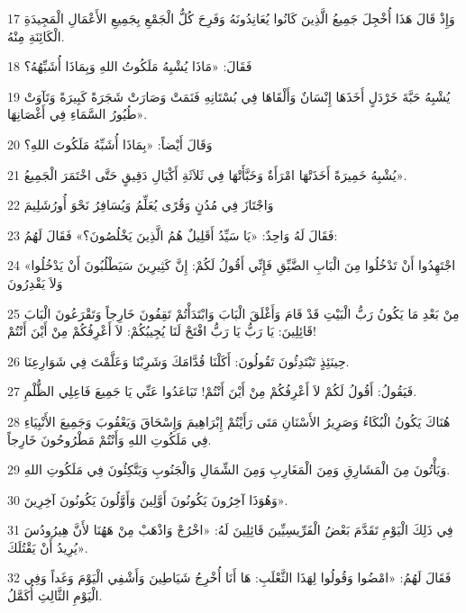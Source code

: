 \par 17 وَإِذْ قَالَ هَذَا أُخْجِلَ جَمِيعُ الَّذِينَ كَانُوا يُعَانِدُونَهُ وَفَرِحَ كُلُّ الْجَمْعِ بِجَمِيعِ الأَعْمَالِ الْمَجِيدَةِ الْكَائِنَةِ مِنْهُ.
\par 18 فَقَالَ: «مَاذَا يُشْبِهُ مَلَكُوتُ اللهِ وَبِمَاذَا أُشَبِّهُهُ؟
\par 19 يُشْبِهُ حَبَّةَ خَرْدَلٍ أَخَذَهَا إِنْسَانٌ وَأَلْقَاهَا فِي بُسْتَانِهِ فَنَمَتْ وَصَارَتْ شَجَرَةً كَبِيرَةً وَتَآوَتْ طُيُورُ السَّمَاءِ فِي أَغْصَانِهَا».
\par 20 وَقَالَ أَيْضاً: «بِمَاذَا أُشَبِّهُ مَلَكُوتَ اللهِ؟
\par 21 يُشْبِهُ خَمِيرَةً أَخَذَتْهَا امْرَأَةٌ وَخَبَّأَتْهَا فِي ثَلاَثَةِ أَكْيَالِ دَقِيقٍ حَتَّى اخْتَمَرَ الْجَمِيعُ».
\par 22 وَاجْتَازَ فِي مُدُنٍ وَقُرًى يُعَلِّمُ وَيُسَافِرُ نَحْوَ أُورُشَلِيمَ
\par 23 فَقَالَ لَهُ وَاحِدٌ: «يَا سَيِّدُ أَقَلِيلٌ هُمُ الَّذِينَ يَخْلُصُونَ؟» فَقَالَ لَهُمُ:
\par 24 «اجْتَهِدُوا أَنْ تَدْخُلُوا مِنَ الْبَابِ الضَّيِّقِ فَإِنِّي أَقُولُ لَكُمْ: إِنَّ كَثِيرِينَ سَيَطْلُبُونَ أَنْ يَدْخُلُوا وَلاَ يَقْدِرُونَ
\par 25 مِنْ بَعْدِ مَا يَكُونُ رَبُّ الْبَيْتِ قَدْ قَامَ وَأَغْلَقَ الْبَابَ وَابْتَدَأْتُمْ تَقِفُونَ خَارِجاً وَتَقْرَعُونَ الْبَابَ قَائِلِينَ: يَا رَبُّ يَا رَبُّ افْتَحْ لَنَا يُجِيبُكُمْ: لاَ أَعْرِفُكُمْ مِنْ أَيْنَ أَنْتُمْ!
\par 26 حِينَئِذٍ تَبْتَدِئُونَ تَقُولُونَ: أَكَلْنَا قُدَّامَكَ وَشَرِبْنَا وَعَلَّمْتَ فِي شَوَارِعِنَا.
\par 27 فَيَقُولُ: أَقُولُ لَكُمْ لاَ أَعْرِفُكُمْ مِنْ أَيْنَ أَنْتُمْ! تَبَاعَدُوا عَنِّي يَا جَمِيعَ فَاعِلِي الظُّلْمِ.
\par 28 هُنَاكَ يَكُونُ الْبُكَاءُ وَصَرِيرُ الأَسْنَانِ مَتَى رَأَيْتُمْ إِبْرَاهِيمَ وَإِسْحَاقَ وَيَعْقُوبَ وَجَمِيعَ الأَنْبِيَاءِ فِي مَلَكُوتِ اللهِ وَأَنْتُمْ مَطْرُوحُونَ خَارِجاً.
\par 29 وَيَأْتُونَ مِنَ الْمَشَارِقِ وَمِنَ الْمَغَارِبِ وَمِنَ الشِّمَالِ وَالْجَنُوبِ وَيَتَّكِئُونَ فِي مَلَكُوتِ اللهِ.
\par 30 وَهُوَذَا آخِرُونَ يَكُونُونَ أَوَّلِينَ وَأَوَّلُونَ يَكُونُونَ آخِرِينَ».
\par 31 فِي ذَلِكَ الْيَوْمِ تَقَدَّمَ بَعْضُ الْفَرِّيسِيِّينَ قَائِلِينَ لَهُ: «اخْرُجْ وَاذْهَبْ مِنْ هَهُنَا لأَنَّ هِيرُودُسَ يُرِيدُ أَنْ يَقْتُلَكَ».
\par 32 فَقَالَ لَهُمُ: «امْضُوا وَقُولُوا لِهَذَا الثَّعْلَبِ: هَا أَنَا أُخْرِجُ شَيَاطِينَ وَأَشْفِي الْيَوْمَ وَغَداً وَفِي الْيَوْمِ الثَّالِثِ أُكَمَّلُ.
